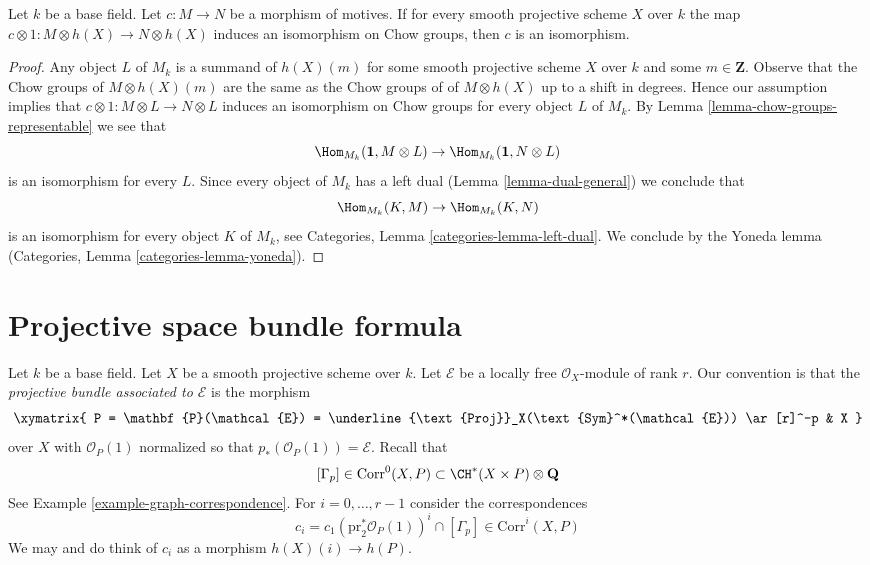 \begin{lemma}[Manin]
\label{lemma-manin}
Let $k$ be a base field. Let $c : M \to N$ be a morphism of motives.
If for every smooth projective scheme $X$ over $k$ the map
$c \otimes 1 : M \otimes h(X) \to N \otimes h(X)$ induces an isomorphism on
Chow groups, then $c$ is an isomorphism.
\end{lemma}

\begin{proof}
Any object $L$ of $M_k$ is a summand of $h(X)(m)$ for some smooth projective
scheme $X$ over $k$ and some $m \in \mathbf{Z}$. Observe that the Chow groups
of $M \otimes h(X)(m)$ are the same as the Chow groups of of $M \otimes h(X)$
up to a shift in degrees. Hence our assumption implies
that $c \otimes 1 : M \otimes L \to N \otimes L$ induces an isomorphism on
Chow groups for every object $L$ of $M_k$. By
Lemma \ref{lemma-chow-groups-representable}
we see that
$$
\Hom_{M_k}(\mathbf{1}, M \otimes L) \to
\Hom_{M_k}(\mathbf{1}, N \otimes L)
$$
is an isomorphism for every $L$. Since every object of $M_k$ has a left dual
(Lemma \ref{lemma-dual-general}) we conclude that
$$
\Hom_{M_k}(K, M) \to \Hom_{M_k}(K, N)
$$
is an isomorphism for every object $K$ of $M_k$, see
Categories, Lemma \ref{categories-lemma-left-dual}.
We conclude by the Yoneda lemma
(Categories, Lemma \ref{categories-lemma-yoneda}).
\end{proof}




\section{Projective space bundle formula}
\label{section-projective-space-bundle}

\noindent
Let $k$ be a base field. Let $X$ be a smooth projective scheme over $k$.
Let $\mathcal{E}$ be a locally free $\mathcal{O}_X$-module of rank $r$.
Our convention is that the {\it projective bundle associated to
$\mathcal{E}$} is the morphism
$$
\xymatrix{
P = \mathbf{P}(\mathcal{E}) =
\underline{\text{Proj}}_X(\text{Sym}^*(\mathcal{E}))
\ar[r]^-p
& X
}
$$
over $X$ with $\mathcal{O}_P(1)$ normalized so that
$p_*(\mathcal{O}_P(1)) = \mathcal{E}$. Recall that
$$
[\Gamma_p] \in \text{Corr}^0(X, P) \subset \CH^*(X \times P) \otimes \mathbf{Q}
$$
See Example \ref{example-graph-correspondence}.
For $i = 0, \ldots, r - 1$ consider the correspondences
$$
c_i = c_1(\text{pr}_2^*\mathcal{O}_P(1))^i \cap [\Gamma_p]
\in \text{Corr}^i(X, P)
$$
We may and do think of $c_i$ as a morphism $h(X)(i) \to h(P)$.

